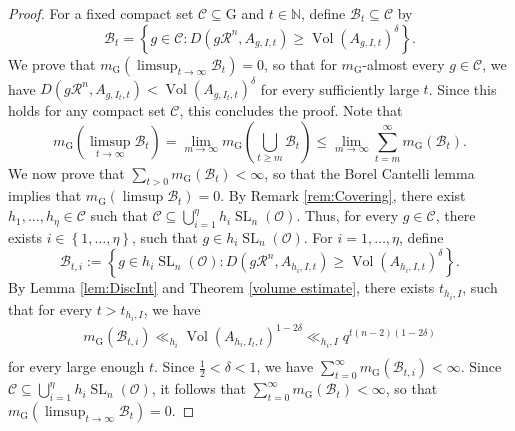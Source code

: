 \documentclass[11pt,a4paper,reqno]{amsart}
\theoremstyle{definition}
\theoremstyle{remark}
\numberwithin{equation}{section}
\begin{document}
\begin{proof}
    For a fixed compact set $\mathcal{C}\subseteq \mathrm{G}$ and $t\in \mathbb{N}$, define $\mathcal{B}_t\subseteq \mathcal{C}$ by
    $$\mathcal{B}_t=\left\{g\in \mathcal{C}:D\left(g\mathcal{R}^n,A_{g,I,t}\right)\geq \operatorname{Vol}(A_{g,I,t})^{\delta}\right\}.$$
    We prove that $m_{\mathrm{G}}\left(\limsup_{t\rightarrow \infty}\mathcal{B}_t\right)=0$, so that for $m_\mathrm{G}$-almost every $g\in \mathcal{C}$, we have $D\left(g\mathcal{R}^n,A_{g,I_t,t}\right)<\operatorname{Vol}(A_{g,I_t,t})^{\delta}$ for every sufficiently large $t$. Since this holds for any compact set $\mathcal{C}$, this concludes the proof. Note that
    $$m_{\mathrm{G}}\left(\limsup_{t\rightarrow \infty}\mathcal{B}_t\right)=\lim_{m\rightarrow \infty}m_{\mathrm{G}}\left(\bigcup_{t\geq m}\mathcal{B}_t\right)\leq \lim_{m\rightarrow\infty}\sum_{t=m}^{\infty}m_{\mathrm{G}}\left(\mathcal{B}_t\right).$$
    We now prove that $\sum_{t>0}m_{\mathrm{G}}(\mathcal{B}_t)<\infty$, so that the Borel Cantelli lemma implies that $m_{\mathrm{G}}(\limsup \mathcal{B}_t)=0$. By Remark \ref{rem:Covering}, there exist $h_1,\dots,h_{\eta}\in \mathcal{C}$ such that $\mathcal{C}\subseteq \bigcup_{i=1}^{\eta}h_i\operatorname{SL}_n(\mathcal{O})$. Thus, for every $g\in \mathcal C$, there exists $ i\in\left\{1,\dots, \eta\right\}$, such that $g\in h_i\operatorname{SL}_n(\mathcal{O})$. For $i=1,\dots, \eta$, define
    \begin{equation}
        \mathcal{B}_{t,i}:=\left\{g\in
        h_i\operatorname{SL}_n(\mathcal{O}):D\left(g\mathcal{R}^n,A_{h_i,I,t}\right)\geq \operatorname{Vol}(A_{h_i,I,t})^{\delta}\right\}.
    \end{equation}
    By Lemma \ref{lem:DiscInt} and Theorem \ref{volume estimate}, there exists $t_{h_i,I}$, such that for every $t>t_{h_i,I}$, we have
    \begin{equation}
    \begin{split}
    \label{eqn:m(B_t,i)Bnd}
        m_{\mathrm{G}}(\mathcal{B}_{t,i})\ll_{h_i}\operatorname{Vol}(A_{h_i,I_t,t})^{1-2\delta}
        \ll_{h_i,I} q^{t(n-2)(1-2\delta)}\\
    \end{split}
    \end{equation}
    for every large enough $t$.
    Since $\frac{1}{2}<\delta<1$,
    we have $\sum_{t=0}^{\infty}m_{\mathrm{G}}(\mathcal{B}_{t,i})<\infty$. 
    Since $\mathcal{C}\subseteq \bigcup_{i=1}^{\eta}h_i\operatorname{SL}_n(\mathcal{O})$, it follows that $\sum_{t=0}^{\infty}m_{\mathrm{G}}(\mathcal{B}_t)<\infty$, so that  $m_{\mathrm{G}}(\limsup_{t\rightarrow \infty}\mathcal{B}_t)=0$. 
\end{proof}
\end{document}
